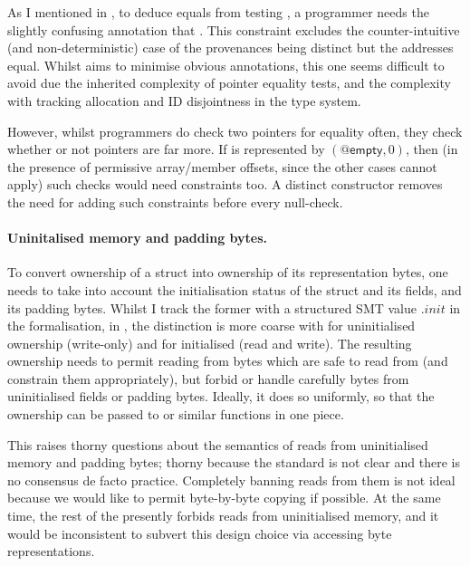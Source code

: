 As I mentioned in , to deduce  equals
 from testing , a programmer needs the slightly
confusing annotation that .%
This constraint excludes the counter-intuitive (and non-deterministic) case of
the provenances being distinct but the addresses equal. Whilst  aims to minimise
obvious annotations, this one seems difficult to avoid due the
inherited complexity of pointer equality tests, and the complexity with
tracking allocation and ID disjointness in the type system.

However, whilst programmers do check two pointers for equality often, they
check whether or not pointers are  far more. If  is
represented by $(@\mathsf{empty}, 0)$, then (in the presence of permissive
array/member offsets, since the other cases cannot apply) such checks would
need constraints too. A distinct  constructor removes the need
for adding such constraints before every null-check.

\paragraph{Uninitalised memory and padding bytes.}%
To convert ownership of a struct into ownership of its representation bytes,
one needs to take into account the initialisation status of the struct and its
fields, and its padding bytes. Whilst I track the former with a structured SMT
value $.\mathit{init}$ in the formalisation, in , the distinction is
more coarse with  for uninitialised ownership (write-only) and
 for initialised (read and write). The resulting ownership
needs to permit reading from bytes which are safe to read from (and constrain
them appropriately), but forbid or handle carefully bytes from uninitialised
fields or padding bytes. Ideally, it does so uniformly, so that the ownership
can be passed to  or similar functions in one piece.

This raises thorny questions about the semantics of reads from uninitialised
memory and padding bytes; thorny because the  standard is not clear and
there is no consensus de facto practice. Completely banning reads from them is
not ideal because we would like to permit byte-by-byte copying if possible. At
the same time, the rest of the  presently forbids reads from
uninitialised memory, and it
would be inconsistent to subvert this design choice via accessing byte
representations.


